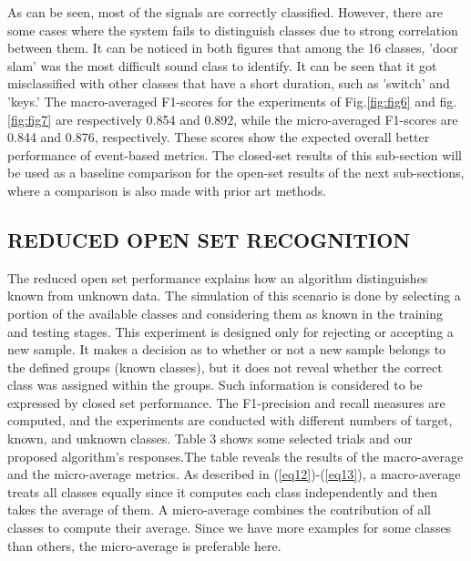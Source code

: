 \documentclass{ieeeaccess}
\begin{document}
As can be seen, most of the signals are correctly classified. However, there are some cases where the system fails to distinguish classes due to strong correlation between them. It can be noticed in both figures that among the 16 classes, 'door slam' was the most difficult sound class to identify. It can be seen that it got misclassified with other classes that have a short duration, such as 'switch' and 'keys.' The macro-averaged F1-scores for the experiments of Fig.\ref{fig:fig6} and fig.\ref{fig:fig7} are respectively 0.854  and 0.892, while the micro-averaged F1-scores are 0.844 and 0.876, respectively. These scores show the expected overall better performance of event-based metrics. The closed-set results of this sub-section will be used as a baseline comparison for the open-set results of the next sub-sections, where a comparison is also made with prior art methods.

\subsection{REDUCED OPEN SET RECOGNITION}
The reduced open set performance explains how an algorithm distinguishes known from unknown data. The simulation of this scenario is done by selecting a portion of the available 
classes and considering them as known in the training and testing stages. This experiment is designed only for rejecting or accepting a new sample. It makes a decision as to whether or not a new sample belongs to the defined groups (known classes), but it does not reveal whether the correct class was assigned within the groups. Such information is considered to be expressed by closed set performance. The F1-precision and recall measures are computed, and the experiments are conducted with different numbers of target, known, and unknown classes. Table 3 shows some selected trials and our proposed algorithm's responses.The table reveals the results of the macro-average and the micro-average metrics. As described in (\ref{eq12})-(\ref{eq13}), a macro-average treats all classes equally since it computes each class independently and then takes the average of them. A micro-average combines the contribution of all classes to compute their average. Since we have more examples for some classes than others, the micro-average is preferable here.\\
 
\end{document}
